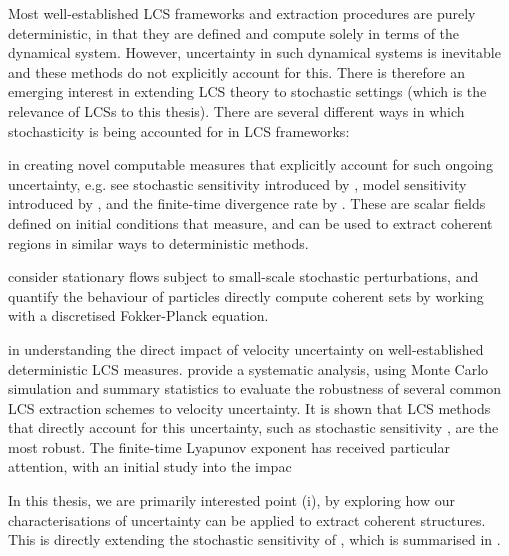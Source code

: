 Most well-established LCS frameworks and extraction procedures are purely deterministic, in that they are defined and compute solely in terms of the dynamical system.
However, uncertainty in such dynamical systems is inevitable and these methods do not explicitly account for this.
There is therefore an emerging interest \citep{Balasuriya_2020_StochasticApproachesLagrangian} in extending LCS theory to stochastic settings (which is the relevance of LCSs to this thesis).
There are several different ways in which stochasticity is being accounted for in LCS frameworks:
\begin{romanate}
	\item in creating novel computable measures that explicitly account for such ongoing uncertainty, e.g. see stochastic sensitivity introduced by \citet{Balasuriya_2020_StochasticSensitivityComputable}, model sensitivity introduced by \citet{KaszasHaller_2020_UniversalUpperEstimate}, and the finite-time divergence rate by \citet{BranickiUda_2023_PathBasedDivergenceRates}.
	These are scalar fields defined on initial conditions that measure, and can be used to extract coherent regions in similar ways to deterministic methods.

	\item \citet{BalasuriyaGottwald_2018_EstimatingStableUnstable} consider stationary flows subject to small-scale stochastic perturbations, and quantify the behaviour of particles
	\citet{DennerEtAl_2016_ComputingCoherentSets} directly compute coherent sets by working with a discretised Fokker-Planck equation.

	\item in understanding the direct impact of velocity uncertainty on well-established deterministic LCS measures.
	\citet{BadzaEtAl_2023_HowSensitiveAre} provide a systematic analysis, using Monte Carlo simulation and summary statistics to evaluate the robustness of several common LCS extraction schemes to velocity uncertainty.
	It is shown that LCS methods that directly account for this uncertainty, such as stochastic sensitivity \citep{Balasuriya_2020_StochasticSensitivityComputable}, are the most robust.
	The finite-time Lyapunov exponent has received particular attention, with an initial study into the impac


\end{romanate}
In this thesis, we are primarily interested point (i), by exploring how our characterisations of uncertainty can be applied to extract coherent structures.
This is directly extending the stochastic sensitivity of \citet{Balasuriya_2020_StochasticSensitivityComputable}, which is summarised in .






